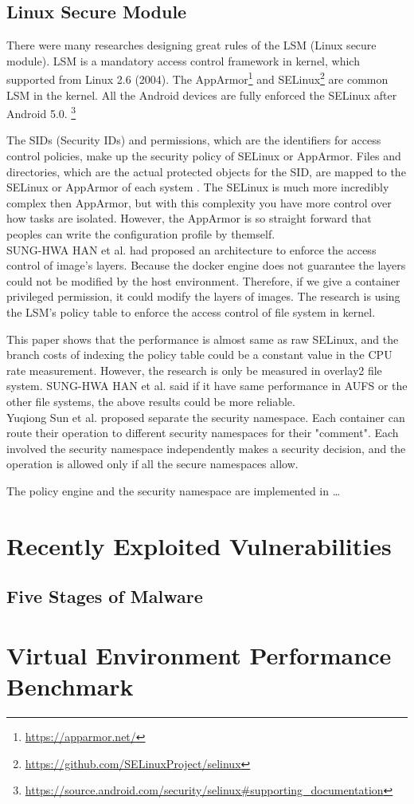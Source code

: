 \subsection{Linux Secure Module}
There were many researches designing great rules of the LSM (Linux secure module). LSM is a
mandatory access control framework in kernel, which supported from Linux 2.6 (2004). The
AppArmor\footnote{\url{https://apparmor.net/}} and SELinux\footnote{\url{https://github.com/SELinuxProject/selinux}}
are common LSM in the kernel. All the
Android devices are fully enforced the SELinux after Android 5.0.
\footnote{\url{https://source.android.com/security/selinux\#supporting\_documentation}}

The SIDs (Security IDs) and permissions, which are the identifiers for access control policies,
make up the security policy of SELinux or AppArmor. Files and directories, which are the actual protected
objects for the SID, are mapped to the SELinux or AppArmor of each system \cite{Smalley2003ImplementingSA,x11-SELinux,quteprints30563}.
The SELinux is much more incredibly complex then AppArmor, but with this complexity you have more
control over how tasks are isolated. However, the AppArmor is so straight forward that peoples can
write the configuration profile by themself. \\

SUNG-HWA HAN et al.\cite{9184912} had proposed an architecture to enforce the access
control of image's layers. Because the docker engine does not guarantee the layers could
not be modified by the host environment. Therefore, if we give a container privileged
permission, it could modify the layers of images. The research \cite{9184912} is using
the LSM's policy table to enforce the access control of file system in kernel.

This paper \cite{9184912} shows that the performance is almost same as raw SELinux,
and the branch costs of indexing the policy table could be a constant value in the
CPU rate measurement. However, the research is only be measured in overlay2 file system.
SUNG-HWA HAN et al. said if it have same performance in AUFS or the other file systems,
the above results could be more reliable. \\

Yuqiong Sun et al.\cite{217614} proposed separate the security namespace. Each container
can route their operation to different security namespaces for their "comment". Each 
involved the security namespace independently makes a security decision, and the
operation is allowed only if all the secure namespaces allow. 


The policy engine and the security namespace are implemented in \dots


\section{Recently Exploited Vulnerabilities}
\subsection{Five Stages of Malware}

\section{Virtual Environment Performance Benchmark}